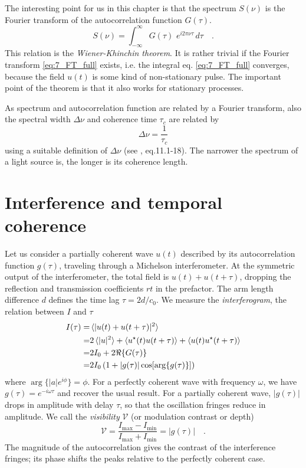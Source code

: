 The interesting point for us in this chapter is that the  spectrum  $S(\nu)$  is the Fourier transform of the autocorrelation function $G(\tau)$. 
\begin{equation}
    S(\nu) = \int_{-\infty}^\infty  G(\tau) \,  \, e^{i 2 \pi \nu \tau} \, d\tau \quad . \label{eq:7_S_G}
\end{equation}
This relation is the \emph{Wiener-Khinchin theorem}. It is rather trivial if the Fourier transform \ref{eq:7_FT_full} exists, i.e. the integral eq. \ref{eq:7_FT_full} converges, because the field $u(t)$ is some kind of non-stationary pulse. The important point of the theorem is that it also works for stationary processes.

As spectrum and autocorrelation function are related by a Fourier transform, also the spectral width $\Delta \nu$ and coherence time $\tau_c$ are related by
\begin{equation}
    \Delta \nu = \frac{1}{\tau_c}
\end{equation}
using a suitable definition of $\Delta \nu$ (see \cite{SalehTeich1991}, eq.11.1-18). The narrower the spectrum of  a light source is, the longer is its coherence length.



\section{Interference and temporal coherence}

Let us consider a partially coherent wave $u(t)$ described by its autocorrelation function $g(\tau)$, traveling through a Michelson interferometer. At the symmetric output of the interferometer, the total field is $u(t) + u(t + \tau)$, dropping the reflection and transmission coefficients  $r t$ in the prefactor. The arm length difference $d$ defines the time lag $\tau = 2 d / c_0$. We measure the \emph{interferogram}, the relation between $I$ and $\tau$
\begin{align}
    I(\tau) = & \braket{|u(t) + u(t + \tau)|^2} \\
    = &  2 \braket{|u|^2} + \braket{u^\star(t) u(t + \tau)} + \braket{u(t) u^\star(t + \tau)} \\
    = & 2 I_0 + 2 \Re\{G(\tau)\} \\
    = & 2 I_0 \left( 1 + |g(\tau)| \cos [ \arg \{ g(\tau )\} ] \right)  \label{eq:7_intfer_g}
\end{align}
where $\arg\{|a| e^{i \phi} \} = \phi$. For a perfectly coherent wave with frequency $\omega$, we have $g(\tau) = e^{-i \omega \tau}$ and recover the usual result. For a partially coherent wave, $|g(\tau)|$ drops in amplitude with delay $\tau$, so that the oscillation fringes reduce in amplitude. We call the \emph{visibility} $\mathcal{V}$ (or modulation contrast or depth)
\begin{equation}
    \mathcal{V} = \frac{I_\text{max}- I_\text{min} }{I_\text{max}+ I_\text{min} } = |g(\tau)| \quad .
\end{equation}
The magnitude of the autocorrelation gives the contrast of the interference fringes; its phase shifts the peaks relative to the perfectly coherent case. 


